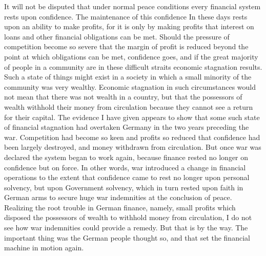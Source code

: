 \documentclass{book}
\begin{document}
It will not be disputed that under normal peace conditions every financial system rests upon confidence. The maintenance of this confidence In these days rests upon an ability to make profits, for it is only by making profits that interest on loans and other financial obligations can be met. Should the pressure of competition become so severe that the margin of profit is reduced beyond the point at which obligations can be met, confidence goes, and if the great majority of people in a community are in these difficult straits economic stagnation results. Such a state of things might exist in a society in which a small minority of the community was very wealthy. Economic stagnation in such circumstances would not mean that there was not wealth in a country, but that the possessors of wealth withhold their money from circulation because they cannot see a return for their capital. The evidence I have given appears to show that some such state of financial stagnation had overtaken Germany in the two years preceding the war. Competition had become so keen and profits so reduced that confidence had been largely destroyed, and money withdrawn from circulation. But once war was declared the system began to work again, because finance rested no longer on confidence but on force. In other words, war introduced a change in financial operations to the extent that confidence came to rest no longer upon personal solvency, but upon Government solvency, which in turn rested upon faith in German arms to secure huge war indemnities at the conclusion of peace. Realizing the root trouble in German finance, namely, small profits which disposed the possessors of wealth to withhold money from circulation, I do not see how war indemnities could provide a remedy. But that is by the way. The important thing was the German people thought so, and that set the financial machine in motion again.
\end{document}
